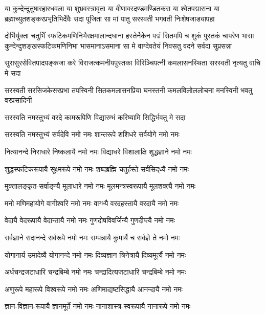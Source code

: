 

\fourlineindentedshloka
{या कुन्देन्दुतुषारहारधवला या शुभ्रवस्त्रावृता}
{या वीणावरदण्डमण्डितकरा या श्वेतपद्मासना}
{या ब्रह्माच्युतशङ्करप्रभृतिभिर्देवैः सदा पूजिता }
{सा मां पातु सरस्वती भगवती निःशेषजाड्यापहा}

\fourlineindentedshloka
{दोर्भिर्युक्ता चतुर्भिं स्फटिकमणिनिभैरक्षमालान्दधाना}
{हस्तेनैकेन पद्मं सितमपि च शुकं पुस्तकं चापरेण}
{भासा कुन्देन्दुशङ्खस्फटिकमणिनिभा भासमानाऽसमाना}
{सा मे वाग्देवतेयं निवसतु वदने सर्वदा सुप्रसन्ना}

\fourlineindentedshloka
{सुरासुरसेवितपादपङ्कजा}
{करे विराजत्कमनीयपुस्तका}
{विरिञ्चिपत्नी कमलासनस्थिता}
{सरस्वती नृत्यतु वाचि मे सदा}

\fourlineindentedshloka
{सरस्वती सरसिजकेसरप्रभा}
{तपस्विनी सितकमलासनप्रिया}
{घनस्तनी कमलविलोललोचना}
{मनस्विनी भवतु वरप्रसादिनी}

\twolineshloka
{सरस्वति नमस्तुभ्यं वरदे कामरूपिणि}
{विद्यारम्भं करिष्यामि सिद्धिर्भवतु मे सदा}

\twolineshloka
{सरस्वति नमस्तुभ्यं सर्वदेवि नमो नमः}
{शान्तरूपे शशिधरे सर्वयोगे नमो नमः}

\twolineshloka
{नित्यानन्दे निराधारे निष्कलायै नमो नमः}
{विद्याधरे विशालाक्षि शुद्धज्ञाने नमो नमः}

\twolineshloka
{शुद्धस्फटिकरूपायै सूक्ष्मरूपे नमो नमः}
{शब्दब्रह्मि चतुर्हस्ते सर्वसिद्‌ध्यै नमो नमः}

\twolineshloka
{मुक्तालङ्कृत-सर्वाङ्ग्यै मूलाधारे नमो नमः}
{मूलमन्त्रस्वरूपायै मूलशक्त्यै नमो नमः}

\twolineshloka
{मनो मणिमहायोगे वागीश्वरि नमो नमः}
{वाग्भ्यै वरदहस्तायै वरदायै नमो नमः}

\twolineshloka
{वेदायै वेदरूपायै वेदान्तायै नमो नमः}
{गुणदोषविवर्जिन्यै गुणदीप्त्यै नमो नमः}

\twolineshloka
{सर्वज्ञाने सदानन्दे सर्वरूपे नमो नमः}
{सम्पन्नायै कुमार्यै च सर्वज्ञे ते नमो नमः}

\twolineshloka
{योगानार्य उमादेव्यै योगानन्दे नमो नमः}
{दिव्यज्ञान त्रिनेत्रायै दिव्यमूर्त्यै नमो नमः}

\twolineshloka
{अर्धचन्द्रजटाधारि चन्द्रबिम्बे नमो नमः}
{चन्द्रादित्यजटाधारि चन्द्रबिम्बे नमो नमः}

\twolineshloka
{अणुरूपे महारूपे विश्वरूपे नमो नमः}
{अणिमाद्यष्टसिद्धायै आनन्दायै नमो नमः}

\twolineshloka
{ज्ञान-विज्ञान-रूपायै ज्ञानमूर्ते नमो नमः}
{नानाशास्त्र-स्वरूपायै नानारूपे नमो नमः}

